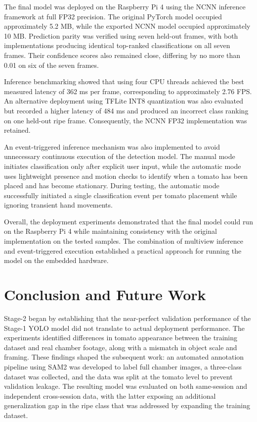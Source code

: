\documentclass[12pt,a4paper]{report}
\begin{document}
The final model was deployed on the Raspberry Pi 4 using the NCNN inference framework at full FP32 precision. The original PyTorch model occupied approximately 5.2 MB, while the exported NCNN model occupied approximately 10 MB. Prediction parity was verified using seven held-out frames, with both implementations producing identical top-ranked classifications on all seven frames. Their confidence scores also remained close, differing by no more than 0.01 on six of the seven frames.

Inference benchmarking showed that using four CPU threads achieved the best measured latency of 362 ms per frame, corresponding to approximately 2.76 FPS. An alternative deployment using TFLite INT8 quantization was also evaluated but recorded a higher latency of 484 ms and produced an incorrect class ranking on one held-out ripe frame. Consequently, the NCNN FP32 implementation was retained.

An event-triggered inference mechanism was also implemented to avoid unnecessary continuous execution of the detection model. The manual mode initiates classification only after explicit user input, while the automatic mode uses lightweight presence and motion checks to identify when a tomato has been placed and has become stationary. During testing, the automatic mode successfully initiated a single classification event per tomato placement while ignoring transient hand movements.

Overall, the deployment experiments demonstrated that the final model could run on the Raspberry Pi 4 while maintaining consistency with the original implementation on the tested samples. The combination of multiview inference and event-triggered execution established a practical approach for running the model on the embedded hardware.

\chapter{Conclusion and Future Work}

Stage-2 began by establishing that the near-perfect validation performance of the Stage-1 YOLO model did not translate to actual deployment performance. The experiments identified differences in tomato appearance between the training dataset and real chamber footage, along with a mismatch in object scale and framing. These findings shaped the subsequent work: an automated annotation pipeline using SAM2 was developed to label full chamber images, a three-class dataset was collected, and the data was split at the tomato level to prevent validation leakage. The resulting model was evaluated on both same-session and independent cross-session data, with the latter exposing an additional generalization gap in the ripe class that was addressed by expanding the training dataset.
\end{document}
